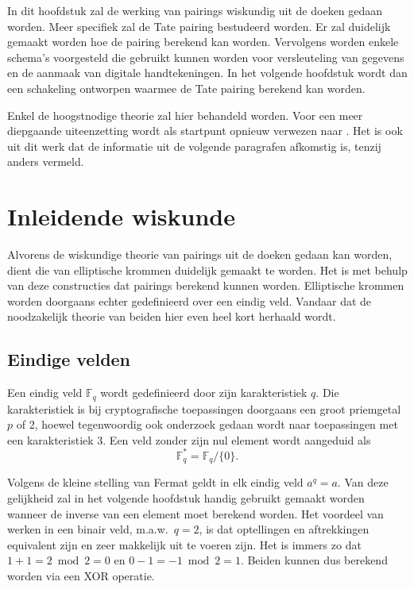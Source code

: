 
In dit hoofdstuk zal de werking van pairings wiskundig uit de doeken gedaan worden. Meer specifiek zal de Tate pairing bestudeerd worden. Er zal duidelijk gemaakt worden hoe de pairing berekend kan worden. Vervolgens worden enkele schema's voorgesteld die gebruikt kunnen worden voor versleuteling van gegevens en de aanmaak van digitale handtekeningen. In het volgende hoofdstuk wordt dan een schakeling ontworpen waarmee de Tate pairing berekend kan worden.

Enkel de hoogstnodige theorie zal hier behandeld worden. Voor een meer diepgaande uiteenzetting wordt als startpunt opnieuw verwezen naar \cite{maas}. Het is ook uit dit werk dat de informatie uit de volgende paragrafen afkomstig is, tenzij anders vermeld.

\section{Inleidende wiskunde}

Alvorens de wiskundige theorie van pairings uit de doeken gedaan kan worden, dient die van elliptische krommen duidelijk gemaakt te worden. Het is met behulp van deze constructies dat pairings berekend kunnen worden. Elliptische krommen worden doorgaans echter gedefinieerd over een eindig veld. Vandaar dat de noodzakelijk theorie van beiden hier even heel kort herhaald wordt.

\subsection{Eindige velden}

Een eindig veld $\mathbb{F}_q$ wordt gedefinieerd door zijn karakteristiek $q$. Die karakteristiek is bij cryptografische toepassingen doorgaans een groot priemgetal $p$ of 2, hoewel tegenwoordig ook onderzoek gedaan wordt naar toepassingen met een karakteristiek 3. Een veld zonder zijn nul element wordt aangeduid als
\[\mathbb{F}_q^* = \mathbb{F}_q / \{ 0 \}.\]

Volgens de kleine stelling van Fermat geldt in elk eindig veld $a^q = a$. Van deze gelijkheid zal in het volgende hoofdstuk handig gebruikt gemaakt worden wanneer de inverse van een element moet berekend worden. Het voordeel van werken in een binair veld, m.a.w.\ $q = 2$, is dat optellingen en aftrekkingen equivalent zijn en zeer makkelijk uit te voeren zijn. Het is immers zo dat $1 + 1 = 2 \bmod 2 = 0$ en $0 - 1 = -1 \bmod 2 = 1$. Beiden kunnen dus berekend worden via een XOR operatie.

